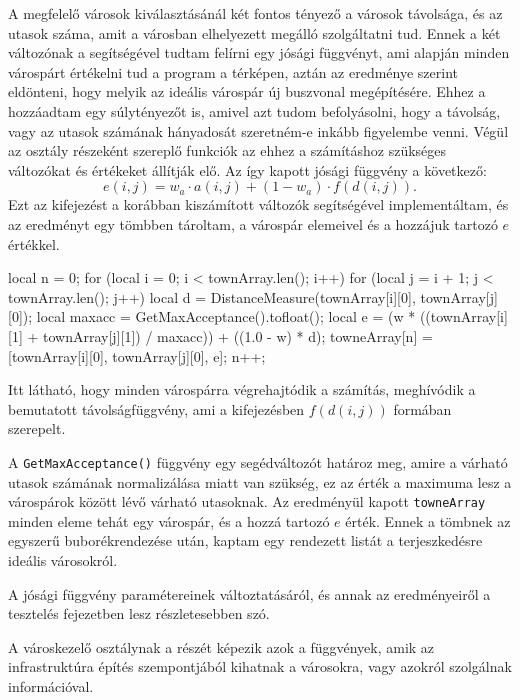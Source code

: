 A megfelelő városok kiválasztásánál két fontos tényező a városok távolsága, és az utasok száma, amit a városban elhelyezett megálló szolgáltatni tud. Ennek a két változónak a segítségével tudtam felírni egy jósági függvényt, ami alapján minden várospárt értékelni tud a program a térképen, aztán az eredménye szerint eldönteni, hogy melyik az ideális várospár új buszvonal megépítésére. Ehhez a hozzáadtam egy súlytényezőt is, amivel azt tudom befolyásolni, hogy a távolság, vagy az utasok számának hányadosát szeretném-e inkább figyelembe venni.
Végül az osztály részeként szereplő funkciók az ehhez a számításhoz szükséges változókat és értékeket állítják elő.
Az így kapott jósági függvény a következő:
\[
e(i, j) = w_{a} \cdot a(i, j) + (1 - w_{a}) \cdot f(d(i, j)).
\]
Ezt az kifejezést a korábban kiszámított változók segítségével implementáltam, és az eredményt egy tömbben tároltam, a várospár elemeivel és a hozzájuk tartozó $e$ értékkel.
\begin{cpp}
local n = 0;
for (local i = 0; i < townArray.len(); i++) {
  for (local j = i + 1; j < townArray.len(); j++) {
    local d = DistanceMeasure(townArray[i][0], townArray[j][0]);
    local maxacc = GetMaxAcceptance().tofloat();
    local e = (w * ((townArray[i][1] + townArray[j][1]) / maxacc))
      + ((1.0 - w) * d);
    towneArray[n] = [townArray[i][0], townArray[j][0], e];
    n++;
  }
}
\end{cpp}
Itt látható, hogy minden várospárra végrehajtódik a számítás, meghívódik a bemutatott távolságfüggvény, ami a kifejezésben $f(d(i,j))$ formában szerepelt.

A \texttt{GetMaxAcceptance()} függvény egy segédváltozót határoz meg, amire a várható utasok számának normalizálása miatt van szükség, ez az érték a maximuma lesz a várospárok között lévő várható utasoknak. Az eredményül kapott \texttt{towneArray} minden eleme tehát egy várospár, és a hozzá tartozó $e$ érték. Ennek a tömbnek az egyszerű buborékrendezése után, kaptam egy rendezett listát a terjeszkedésre ideális városokról.

A jósági függvény paramétereinek változtatásáról, és annak az eredményeiről a tesztelés fejezetben lesz részletesebben szó.


A városkezelő osztálynak a részét képezik azok a függvények, amik az infrastruktúra építés szempontjából kihatnak a városokra, vagy azokról szolgálnak információval.

